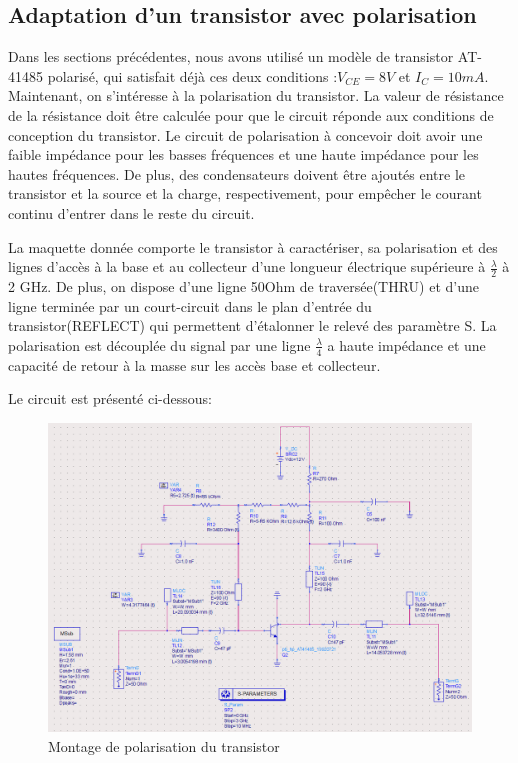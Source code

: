\documentclass[french]{article}
\begin{document}
\subsection{Adaptation d’un transistor avec polarisation}
Dans les sections précédentes, nous avons utilisé un modèle de transistor AT-41485 polarisé, qui satisfait déjà ces deux conditions :$V_{CE}=8 V$ et $I_{C}=10 mA$. Maintenant, on s’intéresse à la polarisation du transistor. La valeur de résistance de la résistance doit être calculée pour que le circuit réponde aux conditions de conception du transistor. Le circuit de polarisation à concevoir doit avoir une faible impédance pour les basses fréquences et une haute impédance pour les hautes fréquences. De plus, des condensateurs doivent être ajoutés entre le transistor et la source et la charge, respectivement, pour empêcher le courant continu d'entrer dans le reste du circuit.

La maquette donnée comporte le transistor à caractériser, sa polarisation et des lignes d'accès à la base et au collecteur d'une longueur électrique supérieure à $\frac{\lambda}{2}$ à 2 GHz. De plus, on dispose d'une ligne 50Ohm de traversée(THRU) et d’une ligne terminée par un court-circuit dans le plan d'entrée du transistor(REFLECT) qui permettent d'étalonner le relevé des paramètre S. La polarisation est découplée du signal par une ligne $\frac{\lambda}{4}$ a haute impédance et une capacité de retour à la masse sur les accès base et collecteur. 

Le circuit est présenté ci-dessous:
\begin{figure}[H]
	\centering
	\includegraphics[width=0.75\linewidth]{../5SynthAmp/polarisation}
	\caption{Montage de polarisation du transistor}
	\label{fig:polarisation}
\end{figure}
\end{document}
